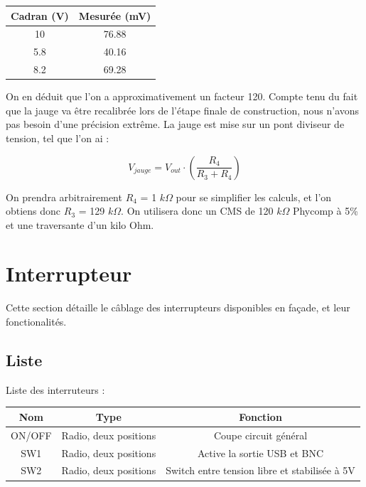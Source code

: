 \documentclass[12pt]{article}
\begin{document}
\begin{center}
	\begin{tabular}{|c|c|}
		\hline
		Cadran (V)	& Mesurée (mV) \\ \hline
		10		& 76.88		\\
		5.8		& 40.16		\\
		8.2		& 69.28		\\
		\hline
	\end{tabular}
\end{center}

On en déduit que l'on a approximativement un facteur 120. Compte tenu du fait que la jauge va être recalibrée lors
de l'étape finale de construction, nous n'avons pas besoin d'une précision extrême. La jauge est mise sur un pont diviseur
de tension, tel que l'on ai :

\begin{equation}
	\boxed{V_{jauge} = V_{out} \cdot ( \frac{R_4}{R_3 + R_4} )}
\end{equation}

On prendra arbitrairement $R_4$ = 1 $k\Omega$ pour se simplifier les calculs, et l'on obtiens donc $R_3$ = 129 $k\Omega$.
On utilisera donc un CMS de 120 $k\Omega$ Phycomp à 5\% et une traversante d'un kilo Ohm.





\newpage
\section{Interrupteur}

Cette section détaille le câblage des interrupteurs disponibles en façade, et leur fonctionalités.

\subsection{Liste}

Liste des interruteurs :\newline


\begin{tabular}{|c|c|c|}
	\hline
	Nom	& Type			& Fonction \\ \hline
	ON/OFF	& Radio, deux positions	& Coupe circuit général \\
	SW1	& Radio, deux positions & Active la sortie USB et BNC \\
	SW2	& Radio, deux positions & Switch entre tension libre et stabilisée à 5V \\
	\hline
\end{tabular}
\end{document}
